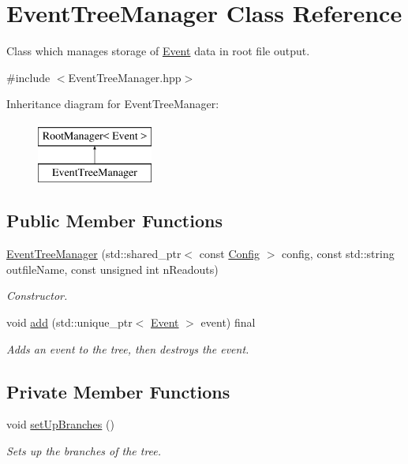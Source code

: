 \hypertarget{class_event_tree_manager}{}\section{Event\+Tree\+Manager Class Reference}
\label{class_event_tree_manager}


Class which manages storage of \hyperlink{class_event}{Event} data in root file output.  




{\ttfamily \#include $<$Event\+Tree\+Manager.\+hpp$>$}

Inheritance diagram for Event\+Tree\+Manager\+:\begin{figure}[H]
\begin{center}
\leavevmode
\includegraphics[height=2.000000cm]{class_event_tree_manager}
\end{center}
\end{figure}
\subsection*{Public Member Functions}
\begin{DoxyCompactItemize}
\item 
\hyperlink{class_event_tree_manager_a923f2a2c38074ddc0d6eb55091400a5f}{Event\+Tree\+Manager} (std\+::shared\+\_\+ptr$<$ const \hyperlink{class_config}{Config} $>$ config, const std\+::string outfile\+Name, const unsigned int n\+Readouts)
\begin{DoxyCompactList}\small\item\em Constructor. \end{DoxyCompactList}\item 
void \hyperlink{class_event_tree_manager_acabb2f6c8dd0e08375b4cf8bf2c148fd}{add} (std\+::unique\+\_\+ptr$<$ \hyperlink{class_event}{Event} $>$ event) final
\begin{DoxyCompactList}\small\item\em Adds an event to the tree, then destroys the event. \end{DoxyCompactList}\end{DoxyCompactItemize}
\subsection*{Private Member Functions}
\begin{DoxyCompactItemize}
\item 
void \hyperlink{class_event_tree_manager_a11cbe0078aeb3d0fe320bbeec335babc}{set\+Up\+Branches} ()
\begin{DoxyCompactList}\small\item\em Sets up the branches of the tree. \end{DoxyCompactList}\end{DoxyCompactItemize}

